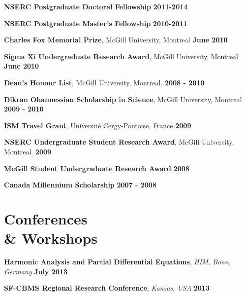\documentclass[margin,line]{resume}
\begin{document}
\begin{resume}
           \textbf{NSERC Postgraduate Doctoral Fellowship} \hfill \textbf{2011-2014}
           
\vspace{-2mm}
          \textbf{NSERC Postgraduate Master's Fellowship} \hfill \textbf{2010-2011}

   \vspace{-2mm}
   \textbf{Charles Fox Memorial Prize}, McGill University, Montreal \hfill \textbf{June 2010}            
   
\vspace{-2mm}
   \textbf{Sigma Xi Undergraduate Research Award}, McGill University, Montreal \hfill \textbf{June 2010}   

\vspace{-2mm}
\textbf{Dean's Honour List}, McGill University, Montreal. \hfill \textbf{2008 - 2010}   

\vspace{-2mm}
   \textbf{Dikran Ohannessian Scholarship in Science}, McGill University, Montreal \hfill \textbf{2009 - 2010}             

\vspace{-2mm}
   \textbf{ISM Travel Grant}, Universit\'e Cergy-Pontoise, France \hfill \textbf{2009}

\vspace{-2mm}
   \textbf{NSERC Undergraduate Student Research Award}, McGill University, Montreal. \hfill \textbf{2009}

\vspace{-2mm}
   \textbf{McGill Student Undergraduate Research Award} \hfill \textbf{2008}    

\vspace{-2mm}
   \textbf{Canada Millennium Scholarship} \hfill \textbf{2007 - 2008}

\vspace{2mm}



    \section{\mysidestyle Conferences \\ \& Workshops}

\textbf{Harmonic Analysis and Partial Differential Equations},  \textsl{HIM, Bonn, Germany}  \hfill \textbf{July 2013}

\vspace{-2mm}
\textbf{SF-CBMS Regional Research Conference},  \textsl{Kansas, USA}  \hfill \textbf{2013}


\end{resume}
\end{document}
